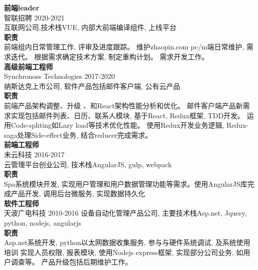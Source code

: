 \documentclass[a4paper,9pt]{extarticle}
\begin{document}
\noindent
\textbf{前端leader} \\
智联招聘 2020-2021 \\
互联网公司,技术栈VUE, 内部大前端编译组件, 上线平台 \\ 
\textbf{职责} \\
前端组内日常管理工作, 评审及进度跟踪。 维护zhaopin.com pc/m端日常维护, 需求迭代。 根据需求确定技术方案, 制定重构计划。 需求开发工作。 \\ 

\noindent
\textbf{高级前端工程师} \\
Synchronoss Technologies 2017-2020 \\
纳斯达克上市公司, 软件产品包括邮件客户端, 公有云产品 \\
\textbf{职责} \\
前端产品架构调整、升级 、和React架构性能分析和优化。 邮件客户端产品新需求实现包括邮件列表、日历、联系人模块, 基于React, Redux框架, TDD开发。 运用Code-spliting如Lazy load等技术优化性能。 使用Redux开发业务逻辑, Redux-saga处理Side-effect业务, 结合reducer完成需求。\\

\noindent
\textbf{前端工程师} \\
未云科技 2016-2017  \\
云管理平台创业公司, 技术栈AngularJS, gulp, webpack\\
\textbf{职责} \\
Spa系统模块开发, 实现用户管理和用户数据管理功能等需求。使用AngularJS库完成产品开发, 调用后台微服务, 实现数据持久化 \\

\noindent
\textbf{软件工程师} \\
天波广电科技 2010-2016
设备自动化管理产品公司, 主要技术栈Asp.net, Jquery, python, nodejs, angularjs \\
\textbf{职责} \\
Asp.net系统开发, python以太网数据收集服务, 参与与硬件系统调试, 及系统使用培训 实现人员权限, 报表模块, 使用Nodejs express框架, 实现部分公司业务, 如用户调查等。 产品升级包括后期维护工作。


\end{document}
